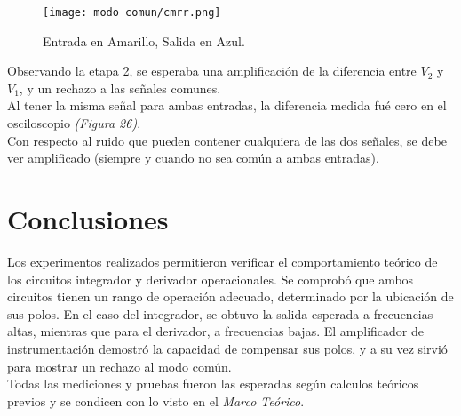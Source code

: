 \documentclass[letterpaper, 10 pt, conference]{ieeeconf}  %
\begin{document}
\begin{figure}[H]
  \centering
  \texttt{[image: modo comun/cmrr.png]}
  \caption{Entrada en Amarillo, Salida en Azul.  }
  \label{fig:cmrr}
\end{figure}

Observando la etapa 2, se esperaba una amplificación de la diferencia entre $V_2$ y $V_1$, y un rechazo a las señales comunes.\\
Al tener la misma señal para ambas entradas, la diferencia medida fué cero en el osciloscopio \textit{(Figura 26)}.\\
Con respecto al ruido que pueden contener cualquiera de las dos señales, se debe ver amplificado (siempre y cuando no sea común a ambas entradas).




\section{Conclusiones}

Los experimentos realizados permitieron verificar el comportamiento teórico de los circuitos integrador y derivador operacionales. Se comprobó que ambos circuitos tienen un rango de operación adecuado, determinado por la ubicación de sus polos. En el caso del integrador, se obtuvo la salida esperada a frecuencias altas, mientras que para el derivador, a frecuencias bajas. El amplificador de instrumentación demostró la capacidad de compensar sus polos, y a su vez sirvió para mostrar un rechazo al modo común.\\
Todas las mediciones y pruebas fueron las esperadas según calculos teóricos previos y se condicen con lo visto en el \textit{Marco Teórico}.
 

\addtolength{\textheight}{-12cm}   %




\end{document}
